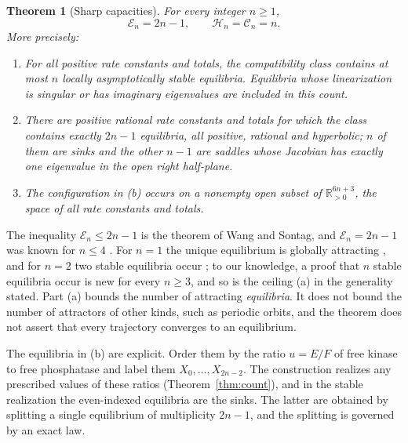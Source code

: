\documentclass[11pt]{article}
\theoremstyle{plain}
\newtheorem{theorem}{Theorem}[section]
\theoremstyle{definition}
\theoremstyle{remark}
\numberwithin{equation}{section}
\newcommand{\R}{\mathbb R}
\newcommand{\capE}{\mathcal E_n}
\newcommand{\capH}{\mathcal H_n}
\newcommand{\capC}{\mathcal C_n}
\begin{document}
\begin{theorem}[Sharp capacities]\label{thm:main}
For every integer \(n\ge1\),
\[
 \capE=2n-1,\qquad \capH=\capC=n .
\]
More precisely:
\begin{enumerate}
\item[\textup{(a)}] For all positive rate constants and totals, the compatibility class
contains at most \(n\) locally asymptotically stable equilibria. Equilibria whose
linearization is singular or has imaginary eigenvalues are included in this count.
\item[\textup{(b)}] There are positive rational rate constants and totals for which the class
contains exactly \(2n-1\) equilibria, all positive, rational and hyperbolic; \(n\) of them are
sinks and the other \(n-1\) are saddles whose Jacobian has exactly one eigenvalue in the open
right half-plane.
\item[\textup{(c)}] The configuration in \textup{(b)} occurs on a nonempty open subset of
\(\R^{6n+3}_{>0}\), the space of all rate constants and totals.
\end{enumerate}
\end{theorem}

The inequality \(\capE\le2n-1\) is the theorem of Wang and Sontag, and \(\capE=2n-1\) was known
for \(n\le4\) \cite{FHC2014}. For \(n=1\) the unique equilibrium is globally attracting
\cite{AngeliSontag2008}, and for \(n=2\) two stable equilibria occur \cite{HellRendall2015}; to
our knowledge, a proof that \(n\) stable equilibria occur is new for every \(n\ge3\), and so is
the ceiling (a) in the generality stated. Part (a) bounds the number of attracting \emph{equilibria}. It does
not bound the number of attractors of other kinds, such as periodic orbits, and the theorem
does not assert that every trajectory converges to an equilibrium.

The equilibria in (b) are explicit. Order them by the ratio \(u=E/F\) of free kinase to free
phosphatase and label them \(X_0,\dots,X_{2n-2}\). The construction realizes any prescribed
values of these ratios (Theorem~\ref{thm:count}), and in the stable realization the
even-indexed equilibria are the sinks. The latter are obtained by splitting a single
equilibrium of multiplicity \(2n-1\), and the splitting is governed by an exact law.
\end{document}
